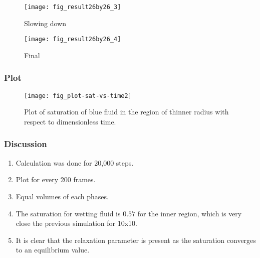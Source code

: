 		
		\begin{figure}[H]
			\texttt{[image: fig\_result26by26\_3]}
			\caption{Slowing down}
		\end{figure}
		
		\begin{figure}[H]
			\texttt{[image: fig\_result26by26\_4]}
			\caption{Final}
		\end{figure}
	
	\subsubsection{Plot}
		\begin{figure}[H]
			\centering
			\texttt{[image: fig\_plot-sat-vs-time2]}
			\caption{Plot of saturation of blue fluid in the region of thinner radius with respect to dimensionless time.}
		\end{figure}
		
	\subsubsection{Discussion}
		\begin{enumerate}
			\item Calculation was done for 20,000 steps.
			\item Plot for every 200 frames.
			\item Equal volumes of each phases.
			\item The saturation for wetting fluid is $0.57$ for the inner region, which is very close the previous simulation for 10x10. 
			\item It is clear that the relaxation parameter is present as the saturation converges to an equilibrium value.
		\end{enumerate}
	
